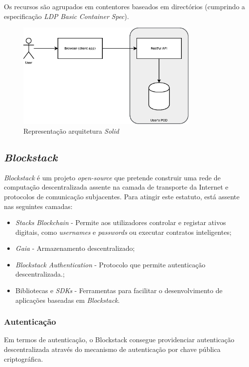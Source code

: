 Os recursos são agrupados em contentores baseados em directórios (cumprindo a especificação \emph{\acrshort{LDP} Basic Container Spec}\cite{solid_spec}).

\begin{figure}[H]
    \begin{center}
    \includegraphics[width=0.8\textwidth]{figures/estado_arte-Solid.eps}
    \caption{Representação arquitetura \emph{Solid}}
    \label{estado_arte_representacao_solid}
    \end{center}
\end{figure}


\subsection{\emph{Blockstack}}
\emph{Blockstack} é um projeto \emph{open-source} que pretende construir uma rede de computação descentralizada assente na camada de transporte da Internet e protocolos de comunicação subjacentes. Para atingir este estatuto, está assente nas seguintes camadas:
\begin{itemize}
	\item \emph{Stacks Blockchain} - Permite aos utilizadores controlar e registar ativos digitais, como \emph{usernames} e \emph{passwords} ou executar contratos inteligentes\cite{blockstack_white_paper};
	\item \emph{Gaia} - Armazenamento descentralizado;
	\item \emph{Blockstack Authentication} - Protocolo que permite autenticação descentralizada.\cite{blockstack_white_paper};
	\item Bibliotecas e \emph{SDKs} - Ferramentas para facilitar o desenvolvimento de aplicações baseadas em \emph{Blockstack}\cite{blockstack_white_paper}.
\end{itemize}

\subsubsection{Autenticação}
Em termos de autenticação, o Blockstack consegue providenciar autenticação descentralizada através do mecanismo de autenticação por chave pública criptográfica. 

